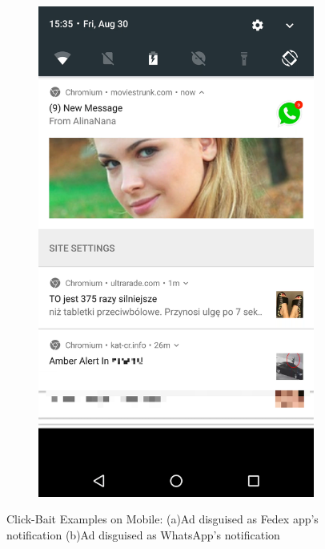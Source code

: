 \begin{figure}[h]
\begin{center}
\begin{subfigure}{.2\textwidth}
    \begin{center}
        \includegraphics[width=\linewidth]{figs/mobile_disguised_3}
        \caption{}
        \label{fig:location}
    \end{center}
    \end{subfigure}
    \caption{Click-Bait Examples on Mobile: (a)Ad disguised as Fedex app's notification (b)Ad disguised as WhatsApp's notification}
    \label{fig:mobile_disguised_notification}
\end{center}
\end{figure}


